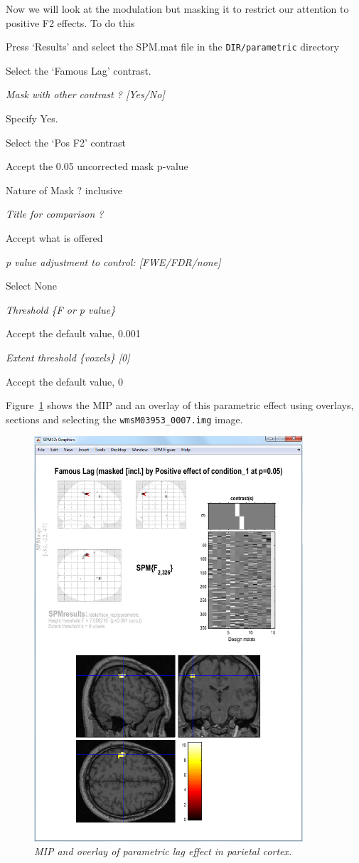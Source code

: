 Now we will look at the modulation but masking it to restrict our attention to positive F2 effects. To do this

\bi
\item{Press `Results' and select the SPM.mat file in the \verb!DIR/parametric! directory}
\item{Select the `Famous Lag' contrast.}
\item{\em Mask with other contrast ? [Yes/No]}
\item{Specify Yes.}
\item{Select the `Pos F2' contrast}
\item{Accept the 0.05 uncorrected mask p-value}
\item{Nature of Mask ? inclusive}
\item{\em Title for comparison ?}
\item{Accept what is offered}
\item{\em p value adjustment to control: [FWE/FDR/none]}
\item{Select None}
\item{\em Threshold \{F or p value\}}
\item{Accept the default value, 0.001}
\item{\em Extent threshold \{voxels\} [0]}
\item{Accept the default value, 0}
\ei

Figure~\ref{famous_lag_mip} shows the MIP and an
overlay of this parametric effect using overlays, sections and selecting the \verb!wmsM03953_0007.img! image. 

\begin{figure}
\begin{center}
\includegraphics[width=100mm]{faces/famous_lag_mip}
\caption{\em MIP and overlay of parametric lag effect in parietal cortex. \label{famous_lag_mip} }
\end{center}
\end{figure}

